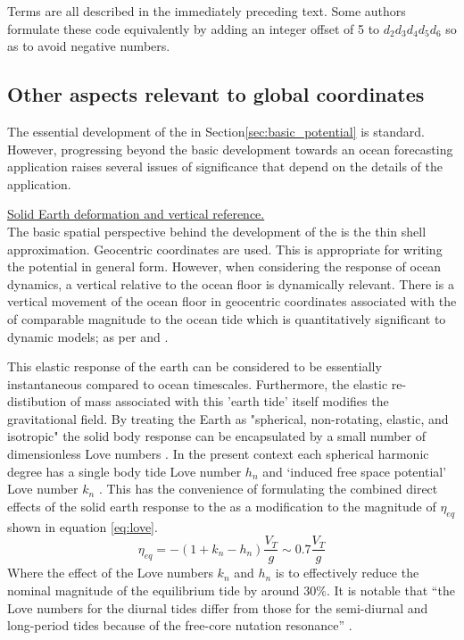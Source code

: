 Terms are all described in the immediately preceding text.
Some authors formulate these code equivalently by adding an integer offset of 5 to $d_2d_3d_4d_5d_6$ so as to avoid negative numbers.

\subsection{Other aspects relevant to global coordinates}
\label{S:ATGP_extras}
The essential development of the \ATGP{} in Section\ref{sec:basic_potential} is standard.  However, progressing beyond the basic development towards an ocean forecasting application raises several issues of significance that depend on the details of the application.


\underline{Solid Earth deformation and vertical reference.}  \\
The basic spatial perspective behind the development of the \ATGP{} is the thin shell approximation.  Geocentric coordinates are used.  This is appropriate for writing the potential in general form.  However, when considering the response of ocean dynamics, a vertical relative to the ocean floor is dynamically relevant.  There is a vertical movement of the ocean floor in geocentric coordinates associated with the \ATGP{} of comparable magnitude to the ocean tide which is quantitatively significant to dynamic models; as per \citet{Hendershott:1981ub} and \citet[pp.336]{gill1982atmosphere}.


This elastic response of the earth can be considered to be essentially instantaneous compared to ocean timescales.  Furthermore, the elastic re-distibution of mass associated with this 'earth tide' itself modifies the gravitational field.    By treating the Earth as "spherical, non-rotating, elastic, and isotropic" the solid body response can be encapsulated by a small number of dimensionless Love numbers \citep{agnew2015}.  In the present context each spherical harmonic degree has a single body tide Love number $h_n$ and `induced free space potential' Love number $k_n$ \citep[Sec 5.3.3]{Urban:2013vl}. This has the convenience of formulating the combined direct effects of the solid earth response to the \ATGP{} as a modification to the magnitude of $\eta_{eq}$ shown in equation \ref{eq:love}.  
\begin{equation}
    \eta_{eq} = -(1+k_n-h_n) \frac{V_T}{g} \sim 0.7 \frac{V_T}{g}
    \label{eq:love}
\end{equation}
Where the effect of the Love numbers $k_n$ and $h_n$ is to effectively reduce the nominal magnitude of the equilibrium tide by around $30\%$. 
It is notable that ``the Love numbers for the diurnal tides differ from those for the semi-diurnal and long-period tides because of the free-core nutation resonance'' \citep{Arbic:2004wz}.

